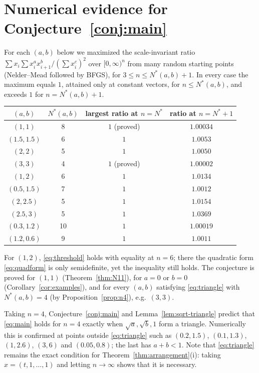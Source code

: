 \documentclass[11pt]{article}
\theoremstyle{remark}
\numberwithin{equation}{section}
\begin{document}
\section{Numerical evidence for Conjecture~\ref{conj:main}}\label{sec:conj}

For each $(a,b)$ below we maximized the scale-invariant ratio
$\sum x_i\sum x_i^ax_{i+1}^b/(\sum x_i^c)^2$ over $[0,\infty)^n$ from many random starting points
(Nelder--Mead followed by BFGS), for $3\le n\le N^*(a,b)+1$. In every case the maximum equals
$1$, attained only at constant vectors, for $n\le N^*(a,b)$, and exceeds $1$ for
$n=N^*(a,b)+1$.

\begin{center}
\begin{tabular}{cccc}
\toprule
$(a,b)$ & $N^*(a,b)$ & largest ratio at $n=N^*$ & ratio at $n=N^*+1$\\
\midrule
$(1,1)$ & 8 & $1$ (proved) & $1.00034$\\
$(1.5,1.5)$ & 6 & $1$ & $1.0053$\\
$(2,2)$ & 5 & $1$ & $1.0050$\\
$(3,3)$ & 4 & $1$ (proved) & $1.00002$\\
$(1,2)$ & 6 & $1$ & $1.0134$\\
$(0.5,1.5)$ & 7 & $1$ & $1.0012$\\
$(2,2.5)$ & 5 & $1$ & $1.0154$\\
$(2.5,3)$ & 5 & $1$ & $1.0369$\\
$(0.3,1.2)$ & 10 & $1$ & $1.00019$\\
$(1.2,0.6)$ & 9 & $1$ & $1.0011$\\
\bottomrule
\end{tabular}
\end{center}

For $(1,2)$, \eqref{eq:threshold} holds with equality at $n=6$; there the quadratic form
\eqref{eq:quadform} is only semidefinite, yet the inequality still holds. The conjecture is
proved for $(1,1)$ (Theorem~\ref{thm:N11}), for $a=0$ or $b=0$ (Corollary~\ref{cor:examples}), and
for every $(a,b)$ satisfying \eqref{eq:triangle} with $N^*(a,b)=4$ (by
Proposition~\ref{prop:n4}), e.g.\ $(3,3)$.

Taking $n=4$, Conjecture~\ref{conj:main} and Lemma~\ref{lem:sqrt-triangle} predict that
\eqref{eq:main} holds for $n=4$ exactly when $\sqrt a,\sqrt b,1$ form a triangle. Numerically this
is confirmed at points outside \eqref{eq:triangle} such as $(0.2,1.5)$, $(0.1,1.3)$, $(1,2.6)$,
$(3,6)$ and $(0.05,0.8)$; the last has $a+b<1$. Note that \eqref{eq:triangle} remains the exact
condition for Theorem~\ref{thm:arrangement}(i): taking $x=(t,1,\dots,1)$ and letting
$n\to\infty$ shows that it is necessary.
\end{document}
